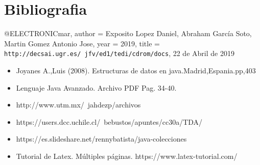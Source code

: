 \documentclass[11pt,a4paper]{report}
\begin{document}
\section{Bibliografia}

@ELECTRONIC{mar,
  author = {{Exposito Lopez Daniel, Abraham Garc\'ia Soto, Martin Gomez Antonio Jose}},
  year = {2019},
  title = {\texttt{http://decsai.ugr.es/~jfv/ed1/tedi/cdrom/docs}, 22 de {A}bril de 2019}
}


\begin{itemize}

	\item Joyanes A.,Luis (2008). Estructuras de  datos en java.Madrid,Espania.pp,403
		
		
		\item Lenguaje Java Avanzado. Archivo PDF Pag. 34-40. 


		\item http://www.utm.mx/~jahdezp/archivos%



		\item https://users.dcc.uchile.cl/~bebustos/apuntes/cc30a/TDA/ 


		\item	https://es.slideshare.net/rennybatista/java-colecciones
		
		
		
		\item Tutorial de Latex. M\'ultiples p\'aginas. https://www.latex-tutorial.com/
	\end{itemize}	
	
	
\end{document}
